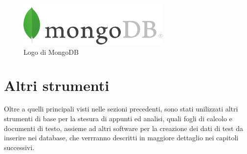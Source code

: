\begin{figure}[htbp]
\begin{center}
\includegraphics[height=6em]{immagini/tecnologies-logos/MongoDB-Logo.png}
\caption{Logo di MongoDB}
\label{fig:mongodb}
\end{center}
\end{figure}

\section{Altri strumenti}
Oltre a quelli principali visti nelle sezioni precedenti, sono stati unilizzati altri strumenti di base per la stesura di appunti ed analisi, quali fogli di calcolo e documenti di testo, assieme ad altri software per la creazione dei dati di test da inserire nei database, che verrranno descritti in maggiore dettaglio nei capitoli successivi.\\
